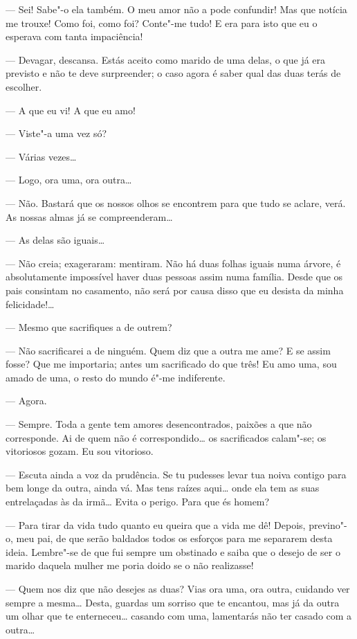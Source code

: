 --- Sei! Sabe"-o ela também. O meu amor não a pode confundir! Mas que
notícia me trouxe! Como foi, como foi? Conte"-me tudo! E era para isto
que eu o esperava com tanta impaciência!

--- Devagar, descansa. Estás aceito como marido de uma delas, o que já
era previsto e não te deve surpreender; o caso agora é saber qual das
duas terás de escolher.

--- A que eu vi! A que eu amo!

--- Viste"-a uma vez só?

--- Várias vezes\ldots{}

--- Logo, ora uma, ora outra\ldots{}

--- Não. Bastará que os nossos olhos se encontrem para que tudo se
aclare, verá. As nossas almas já se compreenderam\ldots{}

--- As delas são iguais\ldots{}

--- Não creia; exageraram: mentiram. Não há duas folhas iguais numa
árvore, é absolutamente impossível haver duas pessoas assim numa
família. Desde que os pais consintam no casamento, não será por causa
disso que eu desista da minha felicidade!\ldots{}

--- Mesmo que sacrifiques a de outrem?

--- Não sacrificarei a de ninguém. Quem diz que a outra me ame? E se
assim fosse? Que me importaria; antes um sacrificado do que três! Eu amo
uma, sou amado de uma, o resto do mundo é"-me indiferente.

--- Agora.

--- Sempre. Toda a gente tem amores desencontrados, paixões a que não
corresponde. Ai de quem não é correspondido\ldots{} os sacrificados calam"-se;
os vitoriosos gozam. Eu sou vitorioso.

--- Escuta ainda a voz da prudência. Se tu pudesses levar tua noiva
contigo para bem longe da outra, ainda vá. Mas tens raízes aqui\ldots{} onde
ela tem as suas entrelaçadas às da irmã\ldots{} Evita o perigo. Para que és
homem?

--- Para tirar da vida tudo quanto eu queira que a vida me dê! Depois,
previno"-o, meu pai, de que serão baldados todos os esforços para me
separarem desta ideia. Lembre"-se de que fui sempre um obstinado e saiba
que o desejo de ser o marido daquela mulher me poria doido se o não
realizasse!

--- Quem nos diz que não desejes as duas? Vias ora uma, ora outra,
cuidando ver sempre a mesma\ldots{} Desta, guardas um sorriso que te
encantou, mas já da outra um olhar que te enterneceu\ldots{} casando com uma,
lamentarás não ter casado com a outra\ldots{}

